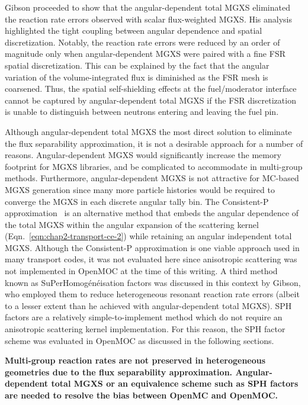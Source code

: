 Gibson proceeded to show that the angular-dependent total \ac{MGXS} eliminated the reaction rate errors observed with scalar flux-weighted \ac{MGXS}. His analysis highlighted the tight coupling between angular dependence and spatial discretization. Notably, the reaction rate errors were reduced by an order of magnitude only when angular-dependent \ac{MGXS} were paired with a fine \ac{FSR} spatial discretization. This can be explained by the fact that the angular variation of the volume-integrated flux is diminished as the \ac{FSR} mesh is coarsened. Thus, the spatial self-shielding effects at the fuel/moderator interface cannot be captured by angular-dependent total \ac{MGXS} if the \ac{FSR} discretization is unable to distinguish between neutrons entering and leaving the fuel pin.

Although angular-dependent total \ac{MGXS} the most direct solution to eliminate the flux separability approximation, it is not a desirable approach for a number of reasons. Angular-dependent \ac{MGXS} would significantly increase the memory footprint for \ac{MGXS} libraries, and be complicated to accommodate in multi-group methods. Furthermore, angular-dependent \ac{MGXS} is not attractive for \ac{MC}-based \ac{MGXS} generation since many more particle histories would be required to converge the \ac{MGXS} in each discrete angular tally bin. The Consistent-P approximation~\cite{bell1967transport} is an alternative method that embeds the angular dependence of the total \ac{MGXS} within the angular expansion of the scattering kernel (Eqn.~\ref{eqn:chap2-transport-ce-2}) while retaining an angular independent total \ac{MGXS}. Although the Consistent-P approximation is one viable approach used in many transport codes, it was not evaluated here since anisotropic scattering was not implemented in OpenMOC at the time of this writing. A third method known as SuPerHomog\'{e}n\'{e}isation factors was discussed in this context by Gibson, who employed them to reduce heterogeneous resonant reaction rate errors (albeit to a lesser extent than he achieved with angular-dependent total \ac{MGXS}). \ac{SPH} factors are a relatively simple-to-implement method which do not require an anisotropic scattering kernel implementation. For this reason, the \ac{SPH} factor scheme was evaluated in OpenMOC as discussed in the following sections.


\begin{emphbox}
\textbf{Multi-group reaction rates are not preserved in heterogeneous geometries due to the flux separability approximation. Angular-dependent total \ac{MGXS} or an equivalence scheme such as \ac{SPH} factors are needed to resolve the bias between OpenMC and OpenMOC.}
\end{emphbox}


